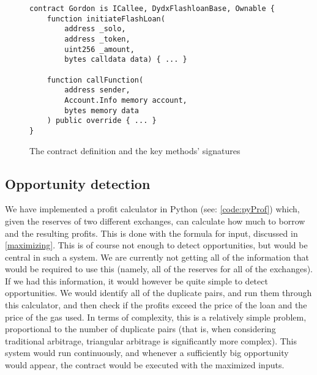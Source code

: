 \begin{figure}[H]
\begin{lstlisting}[language=Solidity,numbers=none]
contract Gordon is ICallee, DydxFlashloanBase, Ownable {
    function initiateFlashLoan(
        address _solo,
        address _token,
        uint256 _amount,
        bytes calldata data) { ... }

    function callFunction(
        address sender,
        Account.Info memory account,
        bytes memory data
    ) public override { ... }
}
\end{lstlisting}
    \caption{The contract definition and the key methods' signatures}
    \label{signature}
\end{figure}

\subsection{Opportunity detection}
We have implemented a profit calculator in Python (see: \ref{code:pyProf}) which,
given the reserves of two different exchanges, can calculate how much to borrow
and the resulting profits. This is done with the formula for input, discussed in
\autoref{maximizing}. This is of course not enough to detect opportunities, but
would be central in such a system. We are currently not getting all of the
information that would be required to use this (namely, all of the reserves for
all of the exchanges). If we had this information, it would however be quite
simple to detect opportunities. We would identify all of the duplicate pairs,
and run them through this calculator, and then check if the profits exceed the
price of the loan and the price of the gas used. In terms of complexity, this is
a relatively simple problem, proportional to the number of duplicate pairs (that
is, when considering traditional arbitrage, triangular arbitrage is
significantly more complex). This system would run continuously, and whenever a
sufficiently big opportunity would appear, the contract would be executed with
the maximized inputs.
